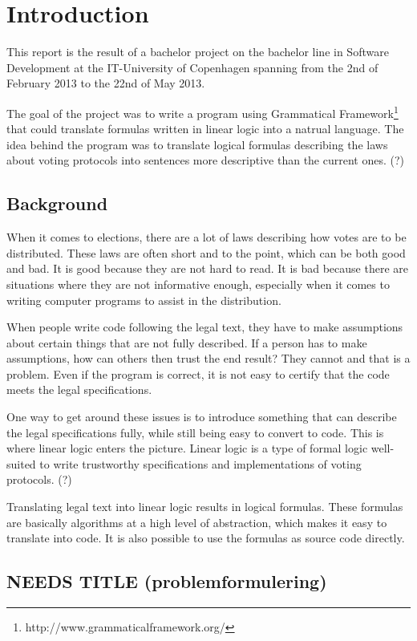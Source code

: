 \chapter{Introduction}
\label{01}

This report is the result of a bachelor project on the bachelor line in Software Development at the IT-University of Copenhagen spanning from the 2nd of February 2013 to the 22nd of May 2013.

The goal of the project was to write a program using Grammatical Framework\footnote{http://www.grammaticalframework.org/} that could translate formulas written in linear logic into a natrual language. The idea behind the program was to translate logical formulas describing the laws about voting protocols into sentences more descriptive than the current ones. (?)

\section{Background}
\label{01_01}
When it comes to elections, there are a lot of laws describing how votes are to be distributed. These laws are often short and to the point, which can be both good and bad. It is good because they are not hard to read. It is bad because there are situations where they are not informative enough, especially when it comes to writing computer programs to assist in the distribution.

When people write code following the legal text, they have to make assumptions about certain things that are not fully described. If a person has to make assumptions, how can others then trust the end result? They cannot and that is a problem. Even if the program is correct, it is not easy to certify that the code meets the legal specifications.

One way to get around these issues is to introduce something that can describe the legal specifications fully, while still being easy to convert to code. This is where linear logic enters the picture. Linear logic is a type of formal logic well-suited to write trustworthy specifications and implementations of voting protocols. (?)

Translating legal text into linear logic results in logical formulas. These formulas are basically algorithms at a high level of abstraction, which makes it easy to translate into code. It is also possible to use the formulas as source code directly.

\section{NEEDS TITLE (problemformulering)}
\label{01_02}

